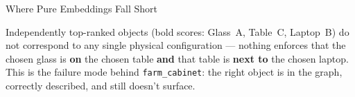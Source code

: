 \documentclass[aspectratio=169]{beamer}
\begin{document}
\begin{frame}{Where Pure Embeddings Fall Short}

\vspace{0.15cm}
\scriptsize Independently top-ranked objects (\textcolor{farmgreen!60!black}{bold scores}:
Glass~A, Table~C, Laptop~B) do not correspond to any single physical configuration ---
nothing enforces that the chosen glass is \textbf{on} the chosen table \textbf{and} that
table is \textbf{next to} the chosen laptop. This is the failure mode behind
\texttt{farm\_cabinet}: the right object is in the graph, correctly described, and still
doesn't surface.
\end{frame}
\end{document}
